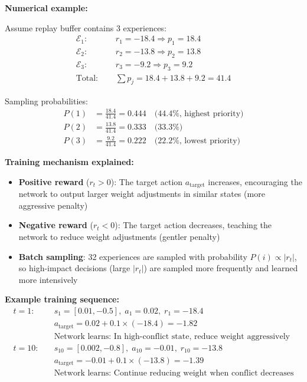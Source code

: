 \documentclass[11pt,a4paper]{article}
\begin{document}
\begin{itemize}
\textbf{Numerical example:}

Assume replay buffer contains 3 experiences:
\begin{align*}
\mathcal{E}_1: & \quad r_1 = -18.4 \Rightarrow p_1 = 18.4 \\
\mathcal{E}_2: & \quad r_2 = -13.8 \Rightarrow p_2 = 13.8 \\
\mathcal{E}_3: & \quad r_3 = -9.2 \Rightarrow p_3 = 9.2 \\
\text{Total: } & \quad \sum p_j = 18.4 + 13.8 + 9.2 = 41.4
\end{align*}

Sampling probabilities:
\begin{align*}
P(1) &= \frac{18.4}{41.4} = 0.444 \quad \text{(44.4\%, highest priority)} \\
P(2) &= \frac{13.8}{41.4} = 0.333 \quad \text{(33.3\%)} \\
P(3) &= \frac{9.2}{41.4} = 0.222 \quad \text{(22.2\%, lowest priority)}
\end{align*}

\textbf{Training mechanism explained:}
\begin{itemize}
    \item \textbf{Positive reward} ($r_t > 0$): The target action $a_{\text{target}}$ increases, encouraging the network to output larger weight adjustments in similar states (more aggressive penalty)
    \item \textbf{Negative reward} ($r_t < 0$): The target action decreases, teaching the network to reduce weight adjustments (gentler penalty)
    \item \textbf{Batch sampling}: 32 experiences are sampled with probability $P(i) \propto |r_t|$, so high-impact decisions (large $|r_t|$) are sampled more frequently and learned more intensively
\end{itemize}

\textbf{Example training sequence:}
\begin{align*}
t=1: \quad & s_1 = [0.01, -0.5], \; a_1 = 0.02, \; r_1 = -18.4 \\
           & a_{\text{target}} = 0.02 + 0.1 \times (-18.4) = -1.82 \\
           & \text{Network learns: In high-conflict state, reduce weight aggressively} \\[5pt]
t=10: \quad & s_{10} = [0.002, -0.8], \; a_{10} = -0.01, \; r_{10} = -13.8 \\
            & a_{\text{target}} = -0.01 + 0.1 \times (-13.8) = -1.39 \\
            & \text{Network learns: Continue reducing weight when conflict decreases}
\end{align*}


\end{itemize}
\end{document}
